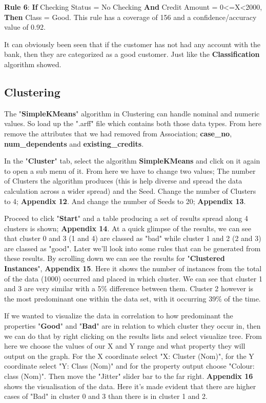 \documentclass[12pt, a4paper]{article}
\begin{document}
    \textbf{Rule 6}: \textbf{If} Checking Status = No Checking \textbf{And} Credit Amount = 0<=X<2000, \textbf{Then} Class = Good. This rule has a coverage of 156 and a confidence/accuracy value of 0.92.
    
    It can obviously been seen that if the customer has not had any account with the bank, then they are categorized as a good customer. Just like the \textbf{Classification} algorithm showed.
    
    \subsection{Clustering}
    The "\textbf{SimpleKMeans}" algorithm in Clustering can handle nominal and numeric values. So load up the ".arff" file which contains both those data types. From here remove the attributes that we had removed from Association; \textbf{case\_no}, \textbf{num\_dependents} and \textbf{existing\_credits}.
    
    In the "\textbf{Cluster}" tab, select the algorithm \textbf{SimpleKMeans} and click on it again to open a sub menu of it. From here we have to change two values; The number of Clusters the algorithm produces (this is help diverse and spread the data calculation across a wider spread) and the Seed. Change the number of Clusters to 4; \textbf{Appendix 12}. And change the number of Seeds to 20; \textbf{Appendix 13}.
    
    Proceed to click "\textbf{Start}" and a table producing a set of results spread along 4 clusters is shown; \textbf{Appendix 14}. At a quick glimpse of the results, we can see that cluster 0 and 3 (1 and 4) are classed as "bad" while cluster 1 and 2 (2 and 3) are classed as "good". Later we'll look into some rules that can be generated from these results. By scrolling down we can see the results for "\textbf{Clustered Instances}", \textbf{Appendix 15}. Here it shows the number of instances from the total of the data (1000) occurred and placed in which cluster. We can see that cluster 1 and 3 are very similar with a 5\% difference between them. Cluster 2 however is the most predominant one within the data set, with it occurring 39\% of the time.
    
    If we wanted to visualize the data in correlation to how predominant the properties "\textbf{Good}" and "\textbf{Bad}" are in relation to which cluster they occur in, then we can do that by right clicking on the results lists and select visualize tree. From here we choose the values of our X and Y range and what property they will output on the graph. For the X coordinate select "X: Cluster (Nom)", for the Y coordinate select "Y: Class (Nom)" and for the property output choose "Colour: class (Nom)". Then move the "Jitter" slider bar to the far right. \textbf{Appendix 16} shows the visualisation of the data. Here it's made evident that there are higher cases of "Bad" in cluster 0 and 3 than there is in cluster 1 and 2.
    
\end{document}
